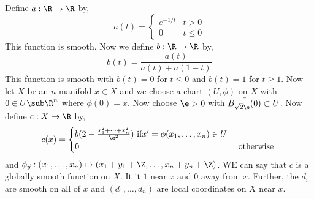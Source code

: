 \begin{eg}[Example 2.1]
  Define $a : \R \to \R$ by,
  $$ a(t) = \begin{cases}
    e^{-1/t} & t > 0 \\
    0 & t \le 0
  \end{cases} $$
  This function is smooth. Now we define $b : \R \to \R$ by,
  $$ b(t) = \frac{a(t)}{a(t) + a(1 - t)} $$
  This function is smooth with $b(t) = 0$ for $t \le 0$ and $b(t) = 1$ for $t \ge 1$. Now let $X$ be an $n$-manifold $x \in X$ and we choose a chart $(U, \phi)$ on $X$ with $0 \in U \sub \R^n$ where $\phi(0) = x$. Now choose $\e > 0$ with $\bar{B_{\sqrt{2}\e}(0)} \subset U$.
  Now define $c : X \to \R$ by,
  $$ c(x) = \begin{cases}
    b(2 - \frac{x_1^2 + \dots + x_n^2}{\e^2}) \text{ if} x' = \phi(x_1, \dots, x_n) \in U \\
    0 & \text{ otherwise }
  \end{cases} $$
  and $\phi_{\vec y} : (x_1, \dots, x_n) \mapsto (x_1 + y_1 + \Z, \dots, x_n + y_n + \Z)$. WE can say that $c$ is a globally smooth function on $X$. It it $1$ near $x$ and $0$ away from $x$. Further, the $d_i$ are smooth on all of $x$ and $(d_1, \dots, d_n)$ are local coordinates on $X$ near $x$.
\end{eg}